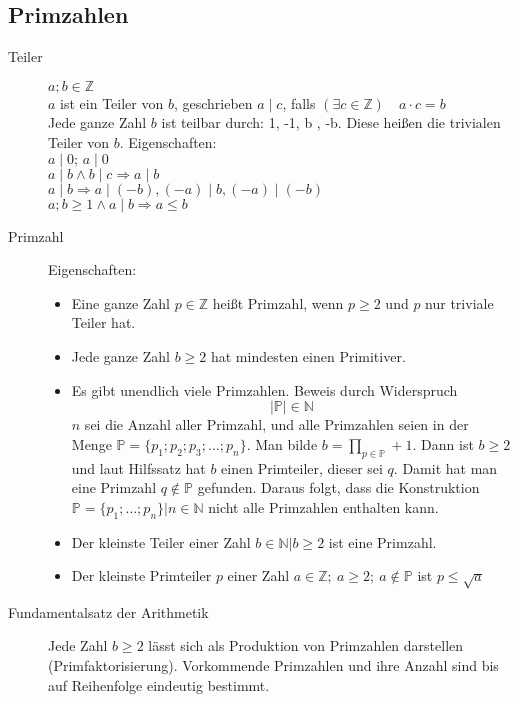 \documentclass[12pt,a4paper]{article}
\begin{document}
\subsection{Primzahlen}
\begin{description}
	\item[Teiler] $a;b \in \mathbb{Z}$\\
		$a$ ist ein Teiler von $b$, geschrieben $a \mid c$, falls $(\exists c \in \mathbb{Z})\quad a \cdot c = b$\\
		Jede ganze Zahl $b$ ist teilbar durch: 1, -1, b , -b. Diese heißen die trivialen Teiler von $b$. Eigenschaften: \\
		$a \mid 0;\, a \mid 0$ \\
		$a \mid b \wedge b \mid c \Rightarrow a \mid b$ \\
		$a \mid b \Rightarrow a \mid (-b), (-a) \mid b, (-a) \mid (-b)$ \\
		$a;b \geq 1 \wedge a \mid b \Rightarrow a \leq b$
	\item[Primzahl] Eigenschaften:
		\begin{itemize}
			\item Eine ganze Zahl $p \in \mathbb{Z}$ heißt Primzahl, wenn $p \geq 2$ und $p$ nur triviale Teiler hat.
			\item Jede ganze Zahl $b \geq 2$ hat mindesten einen Primitiver.
			\item Es gibt unendlich viele Primzahlen. Beweis durch Widerspruch
			      $$|\mathbb{P}| \in \mathbb{N}$$
			      $n$ sei die Anzahl aller Primzahl, und alle Primzahlen seien in der Menge $\mathbb{P} = \lbrace p_1;p_2;p_3;\dots ; p_n \rbrace$. Man bilde $b = \prod\limits_{p \in \mathbb{ P}} + 1$. Dann ist $b \geq 2$ und laut Hilfssatz hat $b$ einen Primteiler, dieser sei $q$. Damit hat man eine Primzahl $q \not \in \mathbb{P}$ gefunden. Daraus folgt, dass die Konstruktion $\mathbb{P} = \lbrace p_1; \dots; p_n \rbrace | n \in \mathbb{N}$ nicht alle Primzahlen enthalten kann.
			\item Der kleinste Teiler einer Zahl $b \in \mathbb{N}|b \geq 2$ ist eine Primzahl.
			\item Der kleinste Primteiler $p$ einer Zahl $a \in \mathbb{Z};\ a \geq 2;\ a \not \in \mathbb{P}$ ist $p \leq \sqrt{a}$
		\end{itemize}
	\item[Fundamentalsatz der Arithmetik] Jede Zahl $b \geq 2$ lässt sich als Produktion von Primzahlen darstellen (Primfaktorisierung). Vorkommende Primzahlen und ihre Anzahl sind bis auf Reihenfolge eindeutig bestimmt.
\end{description}
\end{document}
